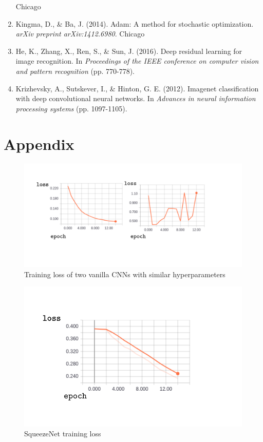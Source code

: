 \documentclass{article}
\begin{document}
\begin{enumerate}
Chicago
\item Kingma, D., \& Ba, J. (2014). Adam: A method for stochastic optimization. \emph{arXiv preprint arXiv:1412.6980}.
Chicago	
\item He, K., Zhang, X., Ren, S., \& Sun, J. (2016). Deep residual learning for image recognition. In \emph{Proceedings of the IEEE conference on computer vision and pattern recognition} (pp. 770-778).
\item Krizhevsky, A., Sutskever, I., \& Hinton, G. E. (2012). Imagenet classification with deep convolutional neural networks. In \emph{Advances in neural information processing systems} (pp. 1097-1105).


\end{enumerate}
\pagebreak
\section*{Appendix}

\begin{figure}[h]
  \includegraphics[width=\linewidth]{loss.pdf}
  \caption{Training loss of two vanilla CNNs with similar hyperparameters}
  \label{fig:loss}
\end{figure}

\begin{figure}[h]
  \includegraphics[width=\linewidth]{squeezeloss.pdf}
  \caption{SqueezeNet training loss}
  \label{fig:squeezeloss}
\end{figure}
\end{document}
